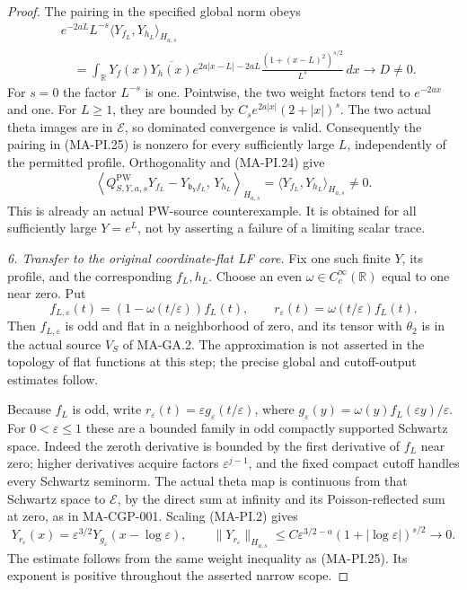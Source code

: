 \begin{proof}
The pairing in the specified global norm obeys
\[
 \begin{split}
 &e^{-2aL}L^{-s}
       \langle Y_{f_L},Y_{h_L}\rangle_{H_{a,s}}\\
 &\quad=\int_{\mathbb R}Y_f(x)\overline{Y_h(x)}
       e^{2a|x-L|-2aL}
       \frac{(1+(x-L)^2)^{s/2}}{L^s}\,dx
             \longrightarrow D\ne0.
 \end{split}
 \tag{MA-PI.25}
\]
For $s=0$ the factor $L^{-s}$ is one.  Pointwise, the
two weight factors tend to $e^{-2ax}$ and one.
For $L\geq1$, they are bounded by
$C_s e^{2a|x|}(2+|x|)^s$.  The two actual theta images
are in $\mathcal E$, so dominated convergence is valid.
Consequently the pairing in (MA-PI.25) is nonzero for
every sufficiently large $L$, independently of the
permitted profile.  Orthogonality and (MA-PI.24) give
\[
 \left\langle
 Q^{\mathrm{PW}}_{S,Y,a,s}Y_{f_L}
              -Y_{\mathfrak b_Yf_L},\,Y_{h_L}
                       \right\rangle_{H_{a,s}}
       =\langle Y_{f_L},Y_{h_L}\rangle_{H_{a,s}}\ne0.
 \tag{MA-PI.26}
\]
This is already an actual PW-source counterexample.
It is obtained for all sufficiently large $Y=e^L$, not
by asserting a failure of a limiting scalar trace.

\emph{6. Transfer to the original coordinate-flat LF core.}
Fix one such finite $Y$, its profile, and the corresponding
$f_L,h_L$.  Choose an even $\omega\in C_c^\infty(\mathbb R)$
equal to one near zero.  Put
\[
 f_{L,\varepsilon}(t)
        =(1-\omega(t/\varepsilon))f_L(t),\qquad
 r_\varepsilon(t)=\omega(t/\varepsilon)f_L(t).
 \tag{MA-PI.27}
\]
Then $f_{L,\varepsilon}$ is odd and flat in a neighborhood
of zero, and its tensor with $\theta_2$ is in the actual
source $V_S$ of MA-GA.2.  The approximation is not
asserted in the topology of flat functions at this step;
the precise global and cutoff-output estimates follow.

Because $f_L$ is odd, write
$r_\varepsilon(t)=\varepsilon g_\varepsilon(t/\varepsilon)$,
where
$g_\varepsilon(y)=\omega(y)f_L(\varepsilon y)/\varepsilon$.
For $0<\varepsilon\leq1$ these are a bounded family in
odd compactly supported Schwartz space.  Indeed the
zeroth derivative is bounded by the first derivative
of $f_L$ near zero; higher derivatives acquire factors
$\varepsilon^{j-1}$, and the fixed compact cutoff
handles every Schwartz seminorm.
The actual theta map is continuous from that Schwartz
space to $\mathcal E$, by the direct sum at infinity
and its Poisson-reflected sum at zero, as in MA-CGP-001.
Scaling (MA-PI.2) gives
\[
 Y_{r_\varepsilon}(x)
       =\varepsilon^{3/2}
          Y_{g_\varepsilon}(x-\log\varepsilon),\qquad
 \|Y_{r_\varepsilon}\|_{H_{a,s}}
       \leq C\varepsilon^{3/2-a}
                    (1+|\log\varepsilon|)^{s/2}
                         \longrightarrow0.
 \tag{MA-PI.28}
\]
The estimate follows from the same weight inequality
as (MA-PI.25).  Its exponent is positive throughout
the asserted narrow scope.


\end{proof}
